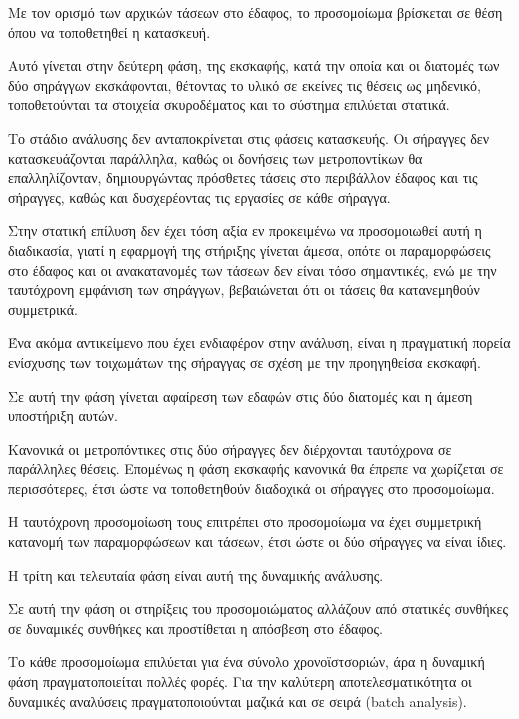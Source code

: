 Με τον ορισμό των αρχικών τάσεων στο έδαφος, το προσομοίωμα βρίσκεται σε θέση όπου να τοποθετηθεί η κατασκευή.

Αυτό γίνεται στην δεύτερη φάση, της εκσκαφής, κατά την οποία και οι διατομές των δύο σηράγγων εκσκάφονται, θέτοντας το υλικό σε εκείνες τις θέσεις ως μηδενικό, τοποθετούνται τα στοιχεία σκυροδέματος και το σύστημα επιλύεται στατικά.

Το στάδιο ανάλυσης δεν ανταποκρίνεται στις φάσεις κατασκευής. Οι σήραγγες δεν κατασκευάζονται παράλληλα, καθώς οι δονήσεις των μετροποντίκων θα επαλληλίζονταν, δημιουργώντας πρόσθετες τάσεις στο περιβάλλον έδαφος και τις σήραγγες, καθώς και δυσχερέοντας τις εργασίες σε κάθε σήραγγα.

Στην στατική επίλυση δεν έχει τόση αξία εν προκειμένω να προσομοιωθεί αυτή η διαδικασία, γιατί η εφαρμογή της στήριξης γίνεται άμεσα, οπότε οι παραμορφώσεις στο έδαφος και οι ανακατανομές των τάσεων δεν είναι τόσο σημαντικές, ενώ με την ταυτόχρονη εμφάνιση των σηράγγων, βεβαιώνεται ότι οι τάσεις θα κατανεμηθούν συμμετρικά.

Ένα ακόμα αντικείμενο που έχει ενδιαφέρον στην ανάλυση, είναι η πραγματική πορεία ενίσχυσης των τοιχωμάτων της σήραγγας σε σχέση με την προηγηθείσα εκσκαφή.

Σε αυτή την φάση γίνεται αφαίρεση των εδαφών στις δύο διατομές και η άμεση υποστήριξη αυτών.

Κανονικά οι μετροπόντικες στις δύο σήραγγες δεν διέρχονται ταυτόχρονα σε παράλληλες θέσεις. Επομένως η φάση εκσκαφής κανονικά θα έπρεπε να χωρίζεται σε περισσότερες, έτσι ώστε να τοποθετηθούν διαδοχικά οι σήραγγες στο προσομοίωμα.

Η ταυτόχρονη προσομοίωση τους επιτρέπει στο προσομοίωμα να έχει συμμετρική κατανομή των παραμορφώσεων και τάσεων, έτσι ώστε οι δύο σήραγγες να είναι ίδιες.

Η τρίτη και τελευταία φάση είναι αυτή της δυναμικής ανάλυσης.

Σε αυτή την φάση οι στηρίξεις του προσομοιώματος αλλάζουν από στατικές συνθήκες σε δυναμικές συνθήκες και προστίθεται η απόσβεση στο έδαφος.

Το κάθε προσομοίωμα επιλύεται για ένα σύνολο χρονοϊστσοριών, άρα η δυναμική φάση πραγματοποιείται πολλές φορές. Για την καλύτερη αποτελεσματικότητα οι δυναμικές αναλύσεις πραγματοποιούνται μαζικά και σε σειρά (batch analysis).


